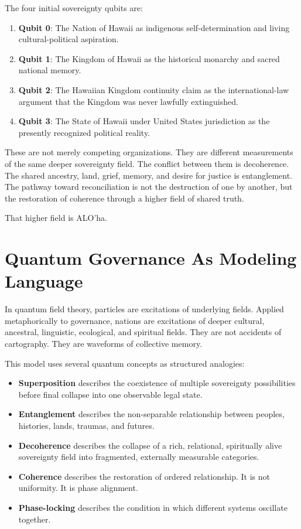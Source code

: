 \documentclass[12pt]{article}
\begin{document}
\aftSovereigntyQubitGraphic

The four initial sovereignty qubits are:

\begin{enumerate}
  \item \textbf{Qubit 0}: The Nation of Hawaii as indigenous self-determination and living cultural-political aspiration.
  \item \textbf{Qubit 1}: The Kingdom of Hawaii as the historical monarchy and sacred national memory.
  \item \textbf{Qubit 2}: The Hawaiian Kingdom continuity claim as the international-law argument that the Kingdom was never lawfully extinguished.
  \item \textbf{Qubit 3}: The State of Hawaii under United States jurisdiction as the presently recognized political reality.
\end{enumerate}

These are not merely competing organizations. They are different measurements of the same deeper sovereignty field. The conflict between them is decoherence. The shared ancestry, land, grief, memory, and desire for justice is entanglement. The pathway toward reconciliation is not the destruction of one by another, but the restoration of coherence through a higher field of shared truth.

That higher field is ALO'ha.

\section{Quantum Governance As Modeling Language}

In quantum field theory, particles are excitations of underlying fields. Applied metaphorically to governance, nations are excitations of deeper cultural, ancestral, linguistic, ecological, and spiritual fields. They are not accidents of cartography. They are waveforms of collective memory.

This model uses several quantum concepts as structured analogies:

\begin{itemize}
  \item \textbf{Superposition} describes the coexistence of multiple sovereignty possibilities before final collapse into one observable legal state.
  \item \textbf{Entanglement} describes the non-separable relationship between peoples, histories, lands, traumas, and futures.
  \item \textbf{Decoherence} describes the collapse of a rich, relational, spiritually alive sovereignty field into fragmented, externally measurable categories.
  \item \textbf{Coherence} describes the restoration of ordered relationship. It is not uniformity. It is phase alignment.
  \item \textbf{Phase-locking} describes the condition in which different systems oscillate together.
\end{itemize}
\end{document}
